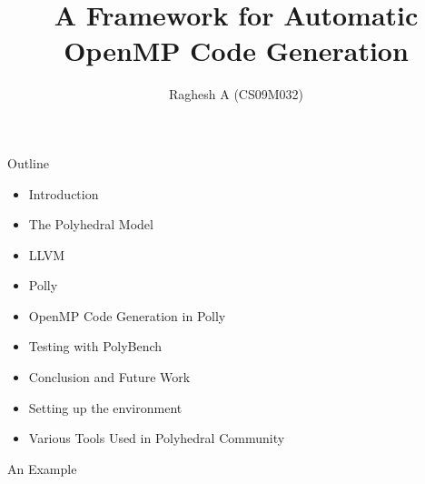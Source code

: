 \documentclass{beamer}
\title{A Framework for Automatic OpenMP Code Generation
 }
\author{Raghesh A (CS09M032)}
\date
\begin{document}
\begin{frame}
\titlepage
\end{frame}

\begin{frame}{Outline}
\begin{itemize}
\item Introduction
\item The Polyhedral Model
\item LLVM
\item Polly
\item OpenMP Code Generation in Polly
\item Testing with PolyBench
\item Conclusion and Future Work
\item Setting up the environment
\item Various Tools Used in Polyhedral Community
\end{itemize}
\end{frame}


\begin{frame}{An Example}
\begin{columns}[t]
\end{columns}
\end{frame}
\end{document}
